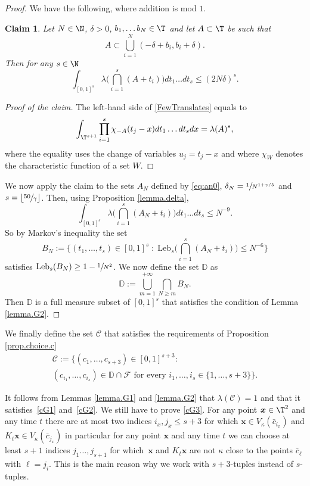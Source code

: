 \documentclass[JEP,XML,SOM,Unicode,NoFloatCountersInSection]{cedram}
\let\DS\relax
\let\ts\textstyle
\newcommand\cC{\mathcal{C}}
\newcommand\cF{\mathcal{F}}
\newcommand\bx{\boldsymbol{x}}
\newcommand\Leb{\mathrm{Leb}}
\theoremstyle{definition}
\theoremstyle{plain}
\newtheorem*{claim}{Claim}
\begin{document}
\begin{proof}
We have the following, where addition is mod $1$.

\begin{claim}
Let $N\in \N$, $\delta>0$, $b_1,\ldots b_N\in \T$ and let $A\subset \T$ be such that
\[
A\subset \bigcup_{i=1}^N(-\delta+b_i,b_i+\delta).
\]
Then for any $s\in \N$
\begin{equation}
\label{FewTranslates}
\int_{[0,1]^s}\lambda\Big( \bigcap_{i=1}^s(A+t_i)\Big)dt_1\ldots dt_s{\leq} (2N\delta)^{s}.
\end{equation}
\end{claim}

\begin{proof}[Proof of the claim]
The left-hand side of \eqref{FewTranslates}
equals to
\[
\int_{\T^{s+1}} \prod_{i=1}^s \chi_{-A} (t_j-x) dt_1\dots dt_s dx=\lambda(A)^s,
\]
where the equality uses the change of variables $u_j=t_j-x$ and where $\chi_W$ denotes the characteristic function of a set $W$.
\end{proof}
We now apply the claim to the sets $A_N$ defined by \eqref{eq:an0}, $\delta_N=\sfrac{1}{N^{1+\gamma/5}}$ and $s=\lfloor \sfrac{50}{\gamma} \rfloor$. Then, using Proposition \ref{lemma.delta},
\[
\int_{[0,1]^s}\lambda\Big(\bigcap_{i=1}^s(A_N+t_i)\Big)dt_1\ldots dt_s\leq N^{-9}.
\]
So by Markov's inequality the set
\[
B_N:=\Big\{(t_1,\ldots,t_s)\in [0,1]^s\;:\; \Leb_s\Big(\ts\bigcap_{i=1}^s(A_N+t_i)\Big)\leq N^{-6}\Big\}
\]
satisfies
$\DS
\Leb_s(B_N)\geq 1-\sfrac{1}{N^2}$.
We now define the set $\mathbb{D}$ as
\[
\mathbb{D}:=\bigcup_{m=1}^{+\infty} \bigcap_{N\geq m}B_N.
\]
Then $\mathbb{D}$ is a full measure subset of $[0,1]^s$ that satisfies the condition of Lemma \ref{lemma.G2}.
\end{proof}

We finally define the set $\cC$ that satisfies the requirements of
Proposition \ref{prop.choice.c}
\begin{multline*}%
\cC:=\Big\{(c_1,\ldots,c_{s+3})\in [0,1]^{s+3}:\\
(c_{i_1},\ldots,c_{i_s})\in \mathbb{D} \cap \cF \text{ for every } i_1,\ldots,i_s\in \{1,\ldots, s+3\}\Big\}.
\end{multline*}

It follows from Lemmas \ref{lemma.G1} and \ref{lemma.G2} that $\lambda(\cC)=1$ and that it satisfies~\eqref{cG1} and~\eqref{cG2}. We still have to prove \eqref{cG3}. { For any point $\bx\in \T^2$ and any time $t$ there are at most two indices $i_x,j_x\leq s+3$ for which $\bx\in V_{\kappa}(\bar{c}_{i_x})$ and $K_t\bx\in V_{\kappa}(\bar{c}_{j_x})$ in particular for any point $ \bx$ and any time $t$ we can choose at least $s+1$ indices $j_1\ldots, j_{s+1}$ for which~$\bx$ and $K_t \bx$ are not $\kappa$ close to the points $\bar{c}_\ell$ with $\ell=j_i$. This is the main reason why we work with $s+3$-tuples instead of $s$-tuples.}
\end{document}
